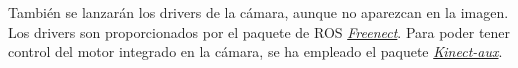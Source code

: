 También se lanzarán los drivers de la cámara, aunque no aparezcan en la imagen. Los drivers son proporcionados por el 
paquete de ROS \textit{\href{https://github.com/ros-drivers/freenect\_stack}{Freenect}}.
Para poder tener control del motor integrado en la cámara, se ha empleado el paquete \textit{\href{https://github.com/muhrix/kinect_aux}{Kinect-aux}}.
    


